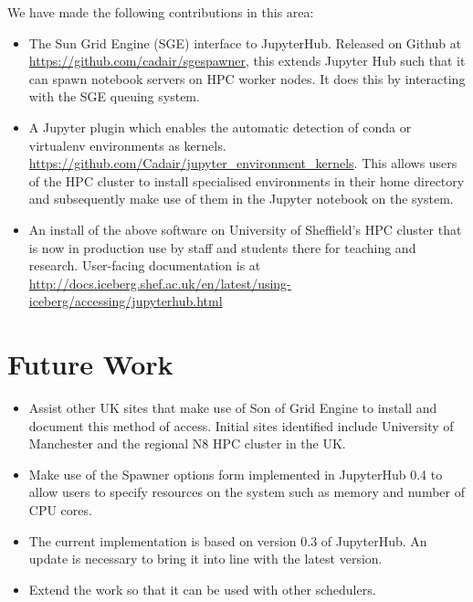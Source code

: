 \documentclass{deliverablereport}
\begin{document}
We have made the following contributions in this area:

\begin{itemize}
\item The Sun Grid Engine (SGE) interface to JupyterHub. Released on Github at \url{https://github.com/cadair/sgespawner}, this extends Jupyter Hub such that it can spawn notebook servers on HPC worker nodes. It does this by interacting with the SGE queuing system.
\item A Jupyter plugin which enables the automatic detection of conda or virtualenv environments as kernels. \url{https://github.com/Cadair/jupyter_environment_kernels}. This allows users of the HPC cluster to install specialised environments in their home directory and subsequently make use of them in the Jupyter notebook on the system.
\item An install of the above software on University of Sheffield's HPC cluster that is now in production use by staff and students there for teaching and research. User-facing documentation is at \url{http://docs.iceberg.shef.ac.uk/en/latest/using-iceberg/accessing/jupyterhub.html}
\end{itemize}

\section{Future Work}
\begin{itemize}
\item Assist other UK sites that make use of Son of Grid Engine to install and document this method of access. Initial sites identified include University of Manchester and the regional N8 HPC cluster in the UK.
\item Make use of the Spawner options form implemented in JupyterHub 0.4 to allow users to specify resources on the system such as memory and number of CPU cores.
\item The current implementation is based on version 0.3 of JupyterHub. An update is necessary to bring it into line with the latest version.
\item Extend the work so that it can be used with other schedulers.
\end{itemize}
\end{document}
